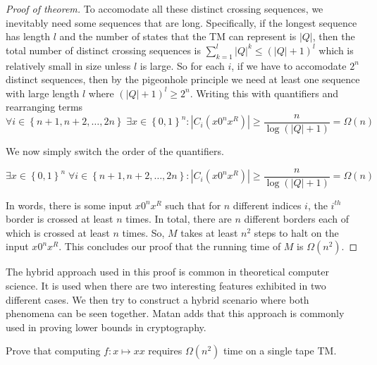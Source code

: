 \documentclass[usletter]{article}
\begin{document}
\begin{proof}[Proof of theorem]
    To accomodate all these distinct crossing sequences, we inevitably need some sequences that are long. Specifically, if the longest sequence has length \(l\) and the number of states that the TM can represent
    is \(|Q|\), then the total number of distinct crossing sequences is \(\sum\limits_{k=1}^{l}|Q|^k \leq (|Q| + 1)^l\) which is relatively small in size unless \(l\) is large. So for each \(i\), if we have to accomodate
    \(2^n\) distinct sequences, then by the pigeonhole principle we need at least one sequence with large length \(l\) where \((|Q| + 1)^l \geq 2^n \). Writing this with quantifiers and rearranging terms
    \begin{equation}
        \forall i \in \left\{ n+1, n+2, \ldots, 2n\right\}\; \exists x \in \left\{ 0,1 \right\}^n : |C_i(x0^nx^R)| \geq \dfrac{n}{\log(|Q| + 1)} = \Omega(n)
    \end{equation}
    
    We now simply switch the order of the quantifiers. 
    
    \begin{equation}
        \exists x \in \left\{ 0,1 \right\}^n \; \forall i \in \left\{ n+1, n+2, \ldots, 2n\right\} : |C_i(x0^nx^R)| \geq \dfrac{n}{\log(|Q| + 1)} = \Omega(n)
    \end{equation}
    
    In words, there is some input \(x0^nx^R\) such that for \(n\) different indices \(i\), the \(i^{th}\) border is crossed at least \(n\) times. 
    In total, there are \(n\) different borders each of which is crossed at least \(n\) times. So, \(M\) takes at least \(n^2\) steps to halt on the input \(x0^nx^R\). 
    This concludes our proof that the running time of \(M\) is \(\Omega(n^2)\).
\end{proof}

\begin{remark}
    The hybrid approach used in this proof is common
    in theoretical computer science. It is used when
    there are two interesting features exhibited in 
    two different cases. We then try to construct a 
    hybrid scenario where both phenomena can be seen together.
    Matan adds that this approach is commonly used in proving
    lower bounds in cryptography. 
\end{remark}

\begin{problem}
    Prove that computing \(f: x \mapsto xx\) requires \(\Omega(n^2)\) time on a single tape TM. 
\end{problem}
\end{document}
